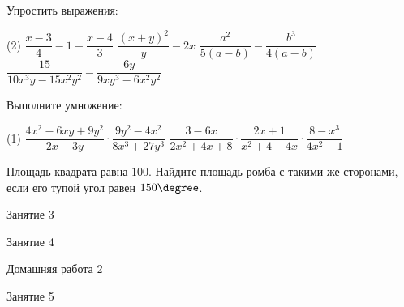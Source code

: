 \begin{homework}[number=1]
	\begin{listofex}
		\item Упростить выражения:
		\begin{tasks}(2)
			\task \( \dfrac{x-3}{4}-1-\dfrac{x-4}{3} \)
			\task \( \dfrac{(x+y)^2}{y}-2x \)
			\task \( \dfrac{a^2}{5(a-b)}-\dfrac{b^3}{4(a-b)} \)
			\task \( \dfrac{15}{10x^3y-15x^2y^2}-\dfrac{6y}{9xy^3-6x^2y^2} \)
		\end{tasks}
		\item Выполните умножение:
		\begin{tasks}(1)
			\task \( \dfrac{4x^2-6xy+9y^2}{2x-3y}\cdot\dfrac{9y^2-4x^2}{8x^3+27y^3} \)
			\task \( \dfrac{3-6x}{2x^2+4x+8}\cdot\dfrac{2x+1}{x^2+4-4x}\cdot\dfrac{8-x^3}{4x^2-1} \)
		\end{tasks}
		\item Площадь квадрата равна \( 100 \). Найдите площадь ромба с такими же сторонами, если его тупой угол равен \( 150\degree \).
	\end{listofex}
\end{homework}

\begin{class}[number=3]
	\begin{listofex}
		\item Занятие 3 
	\end{listofex}
\end{class}

\begin{class}[number=4]
	\begin{listofex}
		\item Занятие 4
	\end{listofex}
\end{class}

\begin{homework}[number=2]
	\begin{listofex}
		\item Домашняя работа 2
	\end{listofex}
\end{homework}

\begin{class}[number=5]
	\begin{listofex}
		\item Занятие 5
	\end{listofex}
\end{class}

